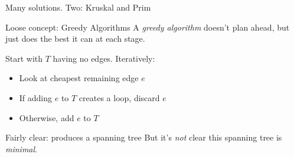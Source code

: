 \documentclass{beamer}
\begin{document}
\begin{frame}{Many solutions.  Two: Kruskal and Prim}
  \begin{block}{Loose concept: Greedy Algorithms}
    A \emph{greedy algorithm} doesn't plan ahead, but just does the best it can at each stage.
  \end{block}

  \begin{definition}
Start with $T$ having no edges. Iteratively:
    \begin{itemize}
    \item Look at cheapest remaining edge $e$
    \item If adding $e$ to $T$ creates a loop, discard $e$
    \item Otherwise, add $e$ to $T$
      \end{itemize}
\end{definition}
  \begin{block}{Fairly clear: produces a spanning tree}
    But it's \emph{not} clear this spanning tree is \emph{minimal}.
  \end{block}
\end{frame}
\end{document}
